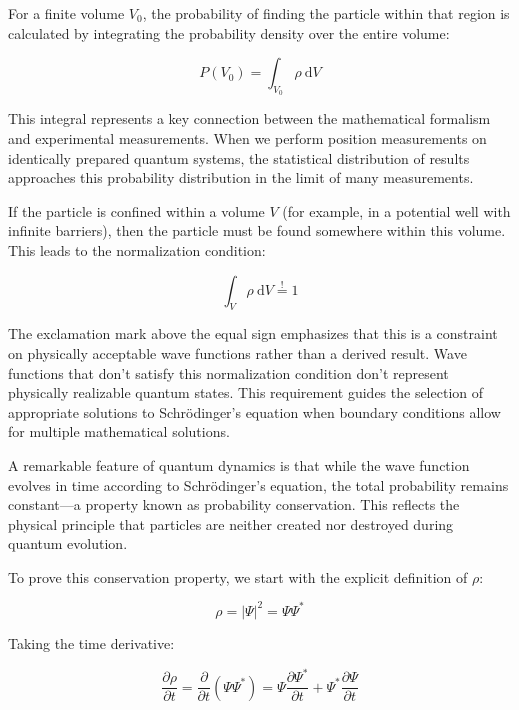 \documentclass[italian]{HKNdocument}
\begin{document}
For a finite volume $V_{0}$, the probability of finding the particle within that region is calculated by integrating the probability density over the entire volume:

\begin{equation}
P\left(V_{0}\right)=\int_{V_{0}} \rho \mathrm{~d} V \label{eq:1.25}
\end{equation}

This integral represents a key connection between the mathematical formalism and experimental measurements. When we perform position measurements on identically prepared quantum systems, the statistical distribution of results approaches this probability distribution in the limit of many measurements.

If the particle is confined within a volume $V$ (for example, in a potential well with infinite barriers), then the particle must be found somewhere within this volume. This leads to the normalization condition:

\begin{equation}
\int_{V} \rho \mathrm{~d} V \stackrel{!}{=} 1 \label{eq:1.26}
\end{equation}

The exclamation mark above the equal sign emphasizes that this is a constraint on physically acceptable wave functions rather than a derived result. Wave functions that don't satisfy this normalization condition don't represent physically realizable quantum states. This requirement guides the selection of appropriate solutions to Schrödinger's equation when boundary conditions allow for multiple mathematical solutions.

A remarkable feature of quantum dynamics is that while the wave function evolves in time according to Schrödinger's equation, the total probability remains constant—a property known as probability conservation. This reflects the physical principle that particles are neither created nor destroyed during quantum evolution.

To prove this conservation property, we start with the explicit definition of $\rho$:

\begin{equation}
\rho=|\Psi|^{2}=\Psi \Psi^{*} \label{eq:1.27}
\end{equation}

Taking the time derivative:

\begin{equation}
\frac{\partial \rho}{\partial t}=\frac{\partial}{\partial t}(\Psi \Psi^{*})=\Psi \frac{\partial \Psi^{*}}{\partial t}+\Psi^{*} \frac{\partial \Psi}{\partial t} \label{eq:1.28}
\end{equation}
\end{document}
